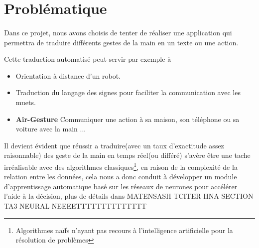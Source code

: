 \section{Problématique}
\paragraph{}
Dans ce projet, nous avons choisis de tenter de réaliser une application qui permettra de traduire différents gestes de la main en un texte ou une action.\par
Cette traduction automatisé peut servir par exemple à 
\begin{itemize}[label=\textbullet]
	\item Orientation à distance d'un robot.
	\item Traduction du langage des signes pour faciliter la communication avec les muets.
	\item \textbf{Air-Gesture} Communiquer une action à sa maison, son téléphone ou sa voiture avec la main ...
\end{itemize}\par 
Il devient évident que réussir a traduire(avec un taux d'exactitude assez raisonnable) des geste de la main en temps réel(ou différé) s'avère être une tache irréalisable avec des algorithmes classiques\footnote{Algorithmes naïfs n'ayant pas recours à l'intelligence artificielle pour la résolution de problèmes}, en raison de la complexité de la relation entre les données, cela nous a donc conduit à développer un module d'apprentissage automatique basé sur les réseaux de neurones \label{ProlemSolver}
 pour accélérer l'aide à la décision, plus de détails dans MATENSASH TCITER HNA SECTION TA3 NEURAL NEEEETTTTTTTTTTTTTT